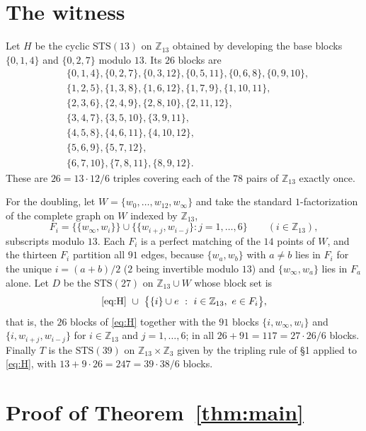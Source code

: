 \documentclass[11pt]{amsart}
\newcommand{\STS}{\mathrm{STS}}
\begin{document}
\section{The witness}

Let $H$ be the cyclic $\STS(13)$ on $\mathbb Z_{13}$ obtained by developing the
base blocks $\{0,1,4\}$ and $\{0,2,7\}$ modulo $13$. Its $26$ blocks are
\begin{equation}\label{eq:H}
\begin{aligned}
&\{0,1,4\},\{0,2,7\},\{0,3,12\},\{0,5,11\},\{0,6,8\},\{0,9,10\},\\
&\{1,2,5\},\{1,3,8\},\{1,6,12\},\{1,7,9\},\{1,10,11\},\\
&\{2,3,6\},\{2,4,9\},\{2,8,10\},\{2,11,12\},\\
&\{3,4,7\},\{3,5,10\},\{3,9,11\},\\
&\{4,5,8\},\{4,6,11\},\{4,10,12\},\\
&\{5,6,9\},\{5,7,12\},\\
&\{6,7,10\},\{7,8,11\},\{8,9,12\}.
\end{aligned}
\end{equation}
These are $26=13\cdot12/6$ triples covering each of the $78$ pairs of
$\mathbb Z_{13}$ exactly once.

For the doubling, let $W=\{w_0,\dots,w_{12},w_\infty\}$ and take the standard
$1$-factorization of the complete graph on $W$ indexed by $\mathbb Z_{13}$,
\[
  F_i=\bigl\{\{w_\infty,w_i\}\bigr\}\cup
      \bigl\{\{w_{i+j},w_{i-j}\}:j=1,\dots,6\bigr\}
  \qquad(i\in\mathbb Z_{13}),
\]
subscripts modulo $13$. Each $F_i$ is a perfect matching of the $14$ points of
$W$, and the thirteen $F_i$ partition all $91$ edges, because
$\{w_a,w_b\}$ with $a\ne b$ lies in $F_i$ for the unique $i=(a+b)/2$ ($2$ being
invertible modulo $13$) and $\{w_\infty,w_a\}$ lies in $F_a$ alone. Let $D$ be
the $\STS(27)$ on $\mathbb Z_{13}\cup W$ whose block set is
\begin{equation}\label{eq:D}
  \eqref{eq:H}\ \cup\
  \bigl\{\{i\}\cup e\ :\ i\in\mathbb Z_{13},\ e\in F_i\bigr\},
\end{equation}
that is, the $26$ blocks of \eqref{eq:H} together with the $91$ blocks
$\{i,w_\infty,w_i\}$ and $\{i,w_{i+j},w_{i-j}\}$ for $i\in\mathbb Z_{13}$ and
$j=1,\dots,6$; in all $26+91=117=27\cdot26/6$ blocks. Finally $T$ is the
$\STS(39)$ on $\mathbb Z_{13}\times\mathbb Z_3$ given by the tripling rule of
\S1 applied to \eqref{eq:H}, with $13+9\cdot26=247=39\cdot38/6$ blocks.

\section{Proof of Theorem~\ref{thm:main}}
\end{document}
